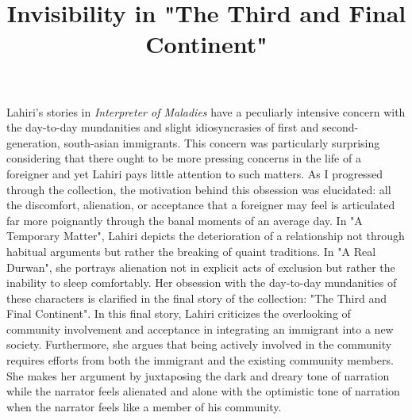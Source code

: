 \documentclass[12pt]{article}
\title{Invisibility in "The Third and Final Continent"}
\date{}
\begin{document}
\maketitle
\doublespacing

\thispagestyle{firststyle}

Lahiri's stories in \textit{Interpreter of Maladies} have a peculiarly intensive concern with the day-to-day mundanities and slight idiosyncrasies of first and second-generation, south-asian immigrants. This concern was particularly surprising considering that there ought to be more pressing concerns in the life of a foreigner and yet Lahiri pays little attention to such matters.
As I progressed through the collection, the motivation behind this obsession was elucidated: all the discomfort, alienation, or acceptance that a foreigner may feel is articulated far more poignantly through the banal moments of an average day. 
In "A Temporary Matter", Lahiri depicts the deterioration of a relationship not through habitual arguments but rather the breaking of quaint traditions. In "A Real Durwan", she portrays alienation not in explicit acts of exclusion but rather the inability to sleep comfortably. Her obsession with the day-to-day mundanities of these characters is clarified in the final story of the collection: "The Third and Final Continent". 
In this final story, Lahiri criticizes the overlooking of community involvement and acceptance in integrating
an immigrant into a new society. Furthermore, she argues that being actively involved in the community requires efforts from both the immigrant and the existing community members. She makes her argument by juxtaposing the dark and dreary tone of narration while the narrator feels alienated and alone with the optimistic tone of narration when the narrator feels like a member of his community.\\
\end{document}
